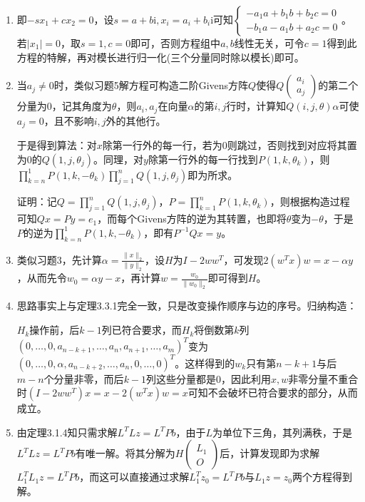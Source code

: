 \documentclass[a4paper,UTF8,fontset=windows]{ctexart}
\begin{document}
\begin{enumerate}
\item
即$-sx_1+cx_2=0$，设$s=a+b\mathrm{i},x_i=a_i+b_i\mathrm{i}$可知$\begin{cases}-a_1a+b_1b+b_2c=0\\-b_1a-a_1b+a_2c=0\end{cases}$。若$|x_1|=0$，取$s=1,c=0$即可，否则方程组中$a,b$线性无关，可令$c=1$得到此方程的特解，再对模长进行归一化(三个分量同时除以模长)即可。

\item
当$a_j\ne0$时，类似习题5解方程可构造二阶Givens方阵$Q$使得$Q\begin{pmatrix}a_i\\a_j\end{pmatrix}$的第二个分量为0，记其角度为$\theta$，则$a_i,a_j$在向量$\alpha$的第$i,j$行时，计算知$Q(i,j,\theta)\alpha$可使$a_j=0$，且不影响$i,j$外的其他行。

于是得到算法：对$x$除第一行外的每一行，若为0则跳过，否则找到对应将其置为0的$Q(1,j,\theta_j)$。同理，对$y$除第一行外的每一行找到$P(1,k,\theta_k)$，则$\prod_{k=n}^1P(1,k,-\theta_k)\prod_{j=1}^nQ(1,j,\theta_j)$即为所求。

证明：记$Q=\prod_{j=1}^nQ(1,j,\theta_j)$，$P=\prod_{k=1}^nP(1,k,\theta_k)$，则根据构造过程可知$Qx=Py=e_1$，而每个Givens方阵的逆为其转置，也即将$\theta$变为$-\theta$，于是$P$的逆为$\prod_{k=n}^1P(1,k,-\theta_k)$，即有$P^{-1}Qx=y$。

\item
类似习题3，先计算$\alpha=\frac{\|x\|_2}{\|y\|_2}$，设$H$为$I-2ww^T$，可发现$2(w^Tx)w=x-\alpha y$，从而先令$w_0=\alpha y-x$，再计算$w=\frac{w_0}{\|w_0\|_2}$即可得到$H$。

\item
思路事实上与定理3.3.1完全一致，只是改变操作顺序与边的序号。归纳构造：

$H_k$操作前，后$k-1$列已符合要求，而$H_k$将倒数第$k$列$(0,\dots,0,a_{n-k+1},\dots,a_n,a_{n+1},\dots,a_m)^T$变为$(0,\dots,0,\alpha,a_{n-k+2},\dots,a_n,0,\dots,0)^T$。这样得到的$w_k$只有第$n-k+1$与后$m-n$个分量非零，而后$k-1$列这些分量都是0，因此利用$x,w$非零分量不重合时$(I-2ww^T)x=x-2(w^Tx)w=x$可知不会破坏已符合要求的部分，从而成立。

\item
由定理3.1.4知只需求解$L^TLz=L^TPb$，由于$L$为单位下三角，其列满秩，于是$L^TLz=L^TPb$有唯一解。将其分解为$H\begin{pmatrix}L_1\\O\end{pmatrix}$后，计算发现即为求解$L_1^TL_1z=L^TPb$，而这可以直接通过求解$L_1^Tz_0=L^TPb$与$L_1z=z_0$两个方程得到解。


\end{enumerate}
\end{document}
